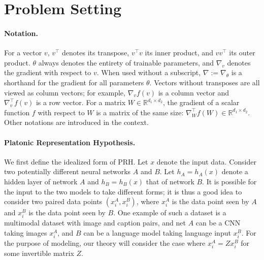 \documentclass[11pt]{article}
\theoremstyle{plain}
\begin{document}
\section{Problem Setting}

\paragraph{Notation.} For a vector $v$, $v^\top$ denotes its transpose, $v^\top v$ its inner product, and $vv^\top$ its outer product. $\theta$ always denotes the entirety of trainable parameters, and $\nabla_v$ denotes the gradient with respect to $v$. When used without a subscript, $\nabla := \nabla_\theta$ is a shorthand for the gradient for all parameters $\theta$. Vectors without transposes are all viewed as column vectors; for example, $\nabla_v f(v)$ is a column vector and $\nabla_v^\top f(v)$ is a row vector. For a matrix $W\in \mathbb{R}^{d_1 \times d_2}$, the gradient of a scalar function $f$ with respect to $W$ is a matrix of the same size: $\nabla_W^\top f(W) \in \mathbb{R}^{d_1 \times d_2}$. Other notations are introduced in the context.


\paragraph{Platonic Representation Hypothesis.} We first define the idealized form of PRH. Let $x$ denote the input data. Consider two potentially different neural networks $A$ and $B$. Let $h_A=h_A(x)$ denote a hidden layer of network $A$ and $h_B=h_B(x)$ that of network $B$. It is possible for the input to the two models to take different forms; it is thus a good idea to consider two paired data points $(x_i^A, x_i^B)$, where $x_i^A$ is the data point seen by $A$ and $x_i^B$ is the data point seen by $B$. One example of such a dataset is a multimodal dataset with image and caption pairs, and net $A$ can be a CNN taking images $x_i^A$, and $B$ can be a language model taking language input $x_i^B$. For the purpose of modeling, our theory will consider the case where $x_i^A = Z x_i^B$ for some invertible matrix $Z$.
\end{document}
